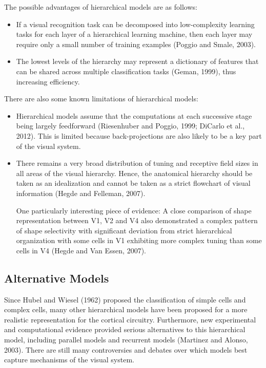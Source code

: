 The possible advantages of hierarchical models are as follows:
\begin{itemize}
    \item If a visual recognition task can be decomposed into low-complexity learning tasks for each layer of a hierarchical learning machine, then each layer may require only a small number of training examples (Poggio and Smale, 2003).
    \item The lowest levels of the hierarchy may represent a dictionary of features that can be shared across multiple classification tasks (Geman, 1999), thus increasing efficiency.
\end{itemize}

There are also some known limitations of hierarchical models:
\begin{itemize}
    \item Hierarchical models assume that the computations at each successive stage being largely feedforward (Riesenhuber and Poggio, 1999; DiCarlo et al., 2012). This is limited because back-projections are also likely to be a key part of the visual system. 
    \item There remains a very broad distribution of tuning and receptive field sizes in all areas of the visual hierarchy. Hence, the anatomical hierarchy should be taken as an idealization and cannot be taken as a strict flowchart of visual information (Hegde and Felleman, 2007). 
    \par One particularly interesting piece of evidence: A close comparison of shape representation between V1, V2 and V4 also demonstrated a complex pattern of shape selectivity with significant deviation from strict hierarchical organization with some cells in V1 exhibiting more complex tuning than some cells in V4 (Hegde and Van Essen, 2007).
\end{itemize}



\subsection{Alternative Models}
Since Hubel and Wiesel (1962) proposed the classification of simple cells and complex cells, many other hierarchical models have been proposed for a more realistic representation for the cortical circuitry. Furthermore, new experimental and computational evidence provided serious alternatives to this hierarchical model, including parallel models and recurrent models (Martinez and Alonso, 2003). There are still many controversies and debates over which models best capture mechanisms of the visual system.

